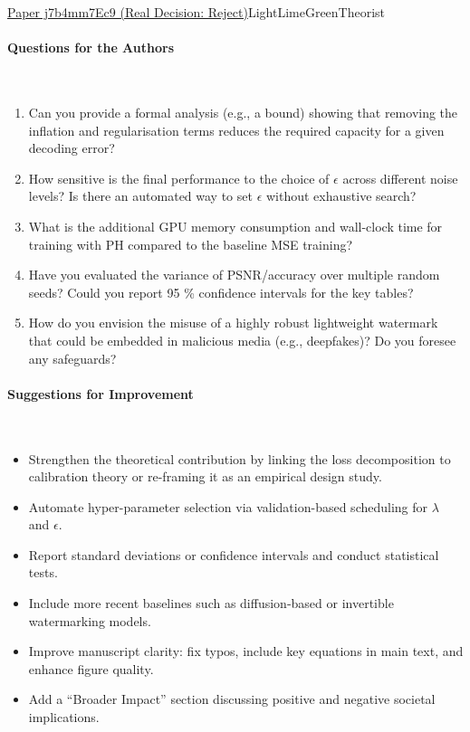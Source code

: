 \documentclass{article} %
\begin{document}
\begin{reviewbox}{\href{https://openreview.net/forum?id=j7b4mm7Ec9}{Paper j7b4mm7Ec9 (Real Decision: Reject)}}{LightLimeGreen}{Theorist}
\paragraph{Questions for the Authors}
\leavevmode\\[0.1em]
\begin{enumerate}[leftmargin=0.5em, itemsep=0pt, topsep=0pt]
    \item Can you provide a formal analysis (e.g., a bound) showing that removing the inflation and regularisation terms reduces the required capacity for a given decoding error?
    \item How sensitive is the final performance to the choice of $\epsilon$ across different noise levels? Is there an automated way to set $\epsilon$ without exhaustive search?
    \item What is the additional GPU memory consumption and wall-clock time for training with PH compared to the baseline MSE training?
    \item Have you evaluated the variance of PSNR/accuracy over multiple random seeds? Could you report 95 \% confidence intervals for the key tables?
    \item How do you envision the misuse of a highly robust lightweight watermark that could be embedded in malicious media (e.g., deepfakes)? Do you foresee any safeguards?
\end{enumerate}

\paragraph{Suggestions for Improvement}
\leavevmode\\[0.1em]
\begin{itemize}[leftmargin=0.5em, itemsep=0pt, topsep=0pt]
    \item Strengthen the theoretical contribution by linking the loss decomposition to calibration theory or re-framing it as an empirical design study.
    \item Automate hyper-parameter selection via validation-based scheduling for $\lambda$ and $\epsilon$.
    \item Report standard deviations or confidence intervals and conduct statistical tests.
    \item Include more recent baselines such as diffusion-based or invertible watermarking models.
    \item Improve manuscript clarity: fix typos, include key equations in main text, and enhance figure quality.
    \item Add a “Broader Impact” section discussing positive and negative societal implications.
\end{itemize}


\end{reviewbox}
\end{document}

